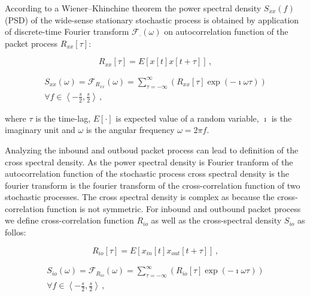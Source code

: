 According to a Wiener–Khinchine %
theorem the power spectral density $S_{xx}(f)$ (PSD) of the wide-sense stationary 
stochastic process is obtained by application of discrete-time 
Fourier transform $\mathcal{F}_{\cdot}(\omega)$ on autocorrelation function 
of the packet process $R_{xx}\left[\tau\right]$:

\begin{equation}\label{eq:corr}
R_{xx}\left[\tau\right] = E[x\left[t\right]x\left[t+\tau\right]]\, , 
\end{equation}

\begin{equation}\label{eq:psd}
\begin{split}
S_{xx}(\omega) = \mathcal{F}_{R_{xx}}\left(\omega\right) = \sum_{\tau=-\infty}^{\infty} 
\left( R_{xx}\left[\tau\right] \exp\left( -\imath \omega\tau \right)\right) \\ 
\forall f \in \left\langle -\frac{s}{2},\frac{s}{2} \right\rangle\, , 
\end{split}
\end{equation}

where $\tau$ is the time-lag, $E\left[\cdot\right]$ is expected value of a random variable, $\imath$
is the imaginary unit and $\omega$ is the angular frequency $\omega= 2\pi f$. 

Analyzing the inbound and outboud packet process can lead to definition of the cross spectral
density\cite{penny2000signal}.
As the power spectral density is Fourier tranform of the autocorrelation function of the 
stochastic process cross spectral density is the fourier transform is the fourier transform
of the cross-correlation function of two stochastic processes. The cross spectral density is
complex as because the cross-correlation function is not symmetric. 
For inbound and outbound packet process we define cross-correlation function $R_{io}$ 
as well as the cross-spectral density $S_{io}$ as follos:

\begin{equation}\label{eq:xcorr}
R_{io}\left[\tau\right] = E[x_{in}\left[t\right]x_{out}\left[t+\tau\right]]\, , 
\end{equation}

\begin{equation}\label{eq:xpsd}
\begin{split}
S_{io}(\omega) = \mathcal{F}_{R_{io}}\left(\omega\right) = \sum_{\tau=-\infty}^{\infty} 
\left( R_{io}\left[\tau\right] \exp\left( -\imath \omega\tau \right)\right) \\ 
\forall f \in \left\langle -\frac{s}{2},\frac{s}{2} \right\rangle\, , 
\end{split}
\end{equation}

